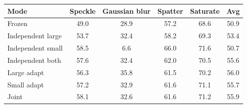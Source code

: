 \begin{tabular}{@{}l cccc c@{}}
\toprule
Mode & Speckle & Gaussian blur & Spatter & Saturate & Avg \\
\midrule
Frozen & 49.0 & 28.9 & 57.2 & 68.6 & 50.9 \\
Independent large & 53.7 & 32.4 & 58.2 & 69.3 & 53.4 \\
Independent small & 58.5 & 6.6 & 66.0 & 71.6 & 50.7 \\
Independent both & 57.6 & 32.4 & 62.0 & 70.5 & 55.6 \\
Large adapt & 56.3 & 35.8 & 61.5 & 70.2 & 56.0 \\
Small adapt & 57.2 & 32.9 & 61.6 & 71.1 & 55.7 \\
Joint & 58.1 & 32.6 & 61.6 & 71.2 & 55.9 \\
\bottomrule
\end{tabular}
